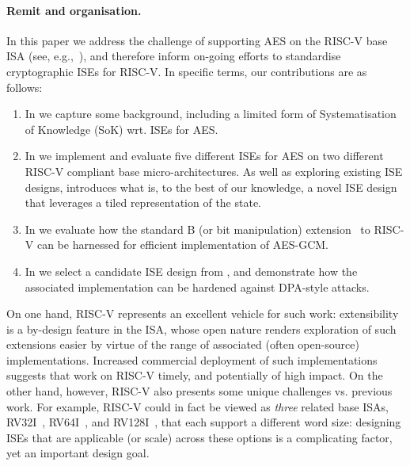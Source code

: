 
\paragraph{Remit and organisation.}

In this paper we address the challenge of supporting AES on the RISC-V base
ISA
(see, e.g.,~\cite{riscv:1,riscv:2}),
and therefore inform on-going efforts to standardise cryptographic ISEs for 
RISC-V.  In specific terms, our contributions are as follows:

\begin{enumerate}

\item In 
      we capture some background, including a limited form of
      Systematisation of Knowledge (SoK)
      wrt. ISEs for AES.

\item In 
      we implement and evaluate five different ISEs for AES on two different 
      RISC-V compliant base micro-architectures.
      As well as exploring existing ISE designs, 
      introduces what is, to the best of our knowledge, a novel ISE design 
      that leverages a tiled representation of the state.

\item In
      we evaluate how the
      standard B 
      (or bit manipulation) 
      extension~\cite[Section 21]{RV:ISA:I:19}
      to RISC-V can be harnessed for efficient implementation of AES-GCM.

\item In
      we select a candidate ISE design from 
      ,
      and demonstrate how the associated implementation can be hardened
      against DPA-style attacks.

\end{enumerate}

\noindent
On one hand, 
RISC-V represents an excellent vehicle for such work:
extensibility is a by-design feature in the ISA, whose open nature renders
exploration of such extensions easier by virtue of the range of associated 
(often open-source) implementations.  
Increased commercial deployment of such implementations suggests that work 
on RISC-V timely, and potentially of high impact.
On the other hand, however,
RISC-V also presents some unique challenges vs. previous work.
For example,
RISC-V could in fact be viewed as {\em three} related base ISAs,
 RV32I~\cite[Section 2]{RV:ISA:I:19},
 RV64I~\cite[Section 5]{RV:ISA:I:19},
and
RV128I~\cite[Section 6]{RV:ISA:I:19},
that each support a different word size:
designing ISEs that are applicable (or scale) across these options is a
complicating factor, yet an important design goal.

